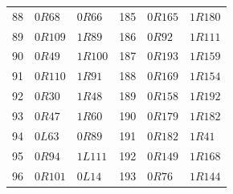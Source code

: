 {\begin{longtable}{rll@{\qquad}rll}
88 & $0R68$ & $0R66$ & 185 & $0R165$ & $1R180$\\
89 & $0R109$ & $1R89$ & 186 & $0R92$ & $1R111$\\
90 & $0R49$ & $1R100$ & 187 & $0R193$ & $1R159$\\
91 & $0R110$ & $1R91$ & 188 & $0R169$ & $1R154$\\
92 & $0R30$ & $1R48$ & 189 & $0R158$ & $1R192$\\
93 & $0R47$ & $1R60$ & 190 & $0R179$ & $1R182$\\
94 & $0L63$ & $0R89$ & 191 & $0R182$ & $1R41$\\
95 & $0R94$ & $1L111$ & 192 & $0R149$ & $1R168$\\
96 & $0R101$ & $0L14$ & 193 & $0R76$ & $1R144$\\
\bottomrule
\end{longtable}
}
